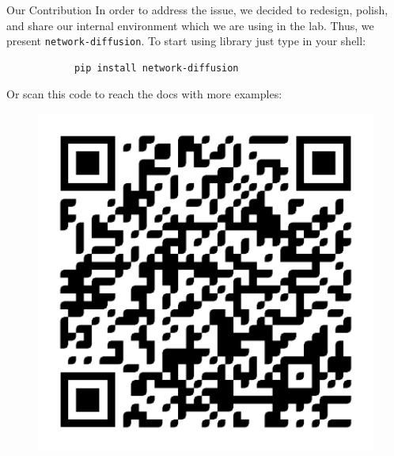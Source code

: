 \documentclass[final]{beamer}
\newlength{\colwidth}
\begin{document}
\begin{frame}[t, fragile]
\begin{columns}[t]
\begin{column}{\colwidth}
\begin{block}{Our Contribution}
    In order to address the issue, we decided to redesign, polish, and share our internal 
    environment which we are using in the lab. Thus, we present
    \lstinline[style=py]{network-diffusion}. To start using library just type in your shell:
    \begin{center}
        \large
        \begin{verbatim}
            pip install network-diffusion
        \end{verbatim}
    \end{center}
    \vspace{-1em}
    Or scan this code to reach the docs with more examples:
    \begin{figure}
        \includegraphics[width=15cm]{../presentation/figures/qr_code.pdf}
    \end{figure}
\end{block}


\end{column}
\end{columns}
\end{frame}
\end{document}
